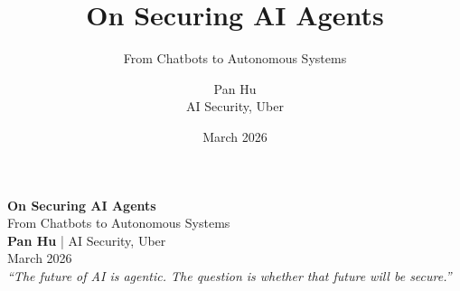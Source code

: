 \documentclass[aspectratio=169,9pt]{beamer}
\title{On Securing AI Agents}
\subtitle{From Chatbots to Autonomous Systems}
\author{Pan Hu \\ \small AI Security, Uber}
\date{March 2026}
\begin{document}
{
\begin{frame}[plain]
\vfill
\begin{center}
{\Huge\bfseries On Securing AI Agents}\\[0.5em]
{\Large From Chatbots to Autonomous Systems}\\[2em]
{\large\bfseries Pan Hu} \quad | \quad AI Security, Uber\\[1em]
March 2026\\[3em]
{\small\itshape ``The future of AI is agentic. The question is whether that future will be secure.''}
\end{center}
\vfill
\end{frame}
}
\end{document}
